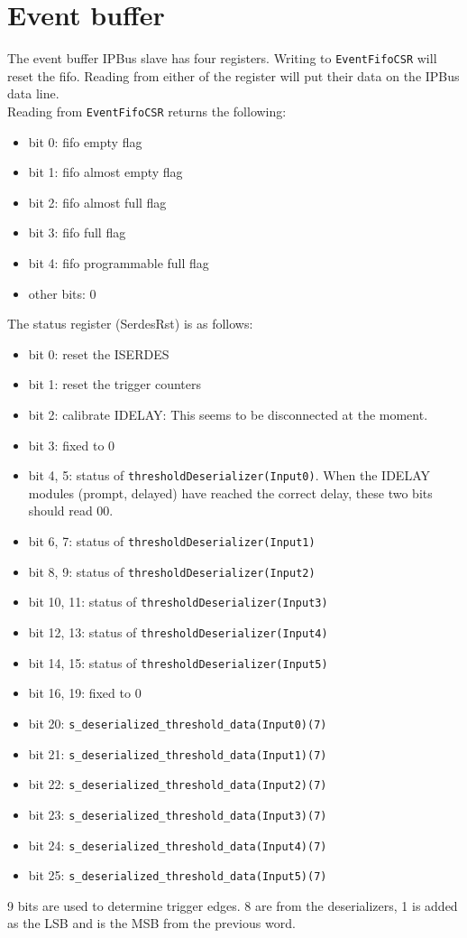 \section{Event buffer}\label{ch:eventBuffer}
The event buffer IPBus slave has four registers.
Writing to \verb|EventFifoCSR| will reset the \gls{fifo}. Reading from either of the register will put their data on the IPBus data line.\\
Reading from \verb|EventFifoCSR| returns the following:
\begin{itemize}
  \item bit 0: \gls{fifo} empty flag
  \item bit 1: \gls{fifo} almost empty flag
  \item bit 2: \gls{fifo} almost full flag
  \item bit 3: \gls{fifo} full flag
  \item bit 4: \gls{fifo} programmable full flag
  \item other bits: 0
\end{itemize}


The status register (SerdesRst) is as follows:
\begin{itemize}
  \item bit 0: reset the ISERDES
  \item bit 1: reset the trigger counters
  \item bit 2: calibrate IDELAY: This seems to be disconnected at the moment.
  \item bit 3: fixed to 0
  \item bit 4, 5: status of \verb|thresholdDeserializer(Input0)|. When the IDELAY modules (prompt, delayed) have reached the correct delay, these two bits should read 00.
  \item bit 6, 7: status of \verb|thresholdDeserializer(Input1)|
  \item bit 8, 9: status of \verb|thresholdDeserializer(Input2)|
  \item bit 10, 11: status of \verb|thresholdDeserializer(Input3)|
  \item bit 12, 13: status of \verb|thresholdDeserializer(Input4)|
  \item bit 14, 15: status of \verb|thresholdDeserializer(Input5)|
  \item bit 16, 19: fixed to 0
  \item bit 20: \verb|s_deserialized_threshold_data(Input0)(7)|
  \item bit 21: \verb|s_deserialized_threshold_data(Input1)(7)|
  \item bit 22: \verb|s_deserialized_threshold_data(Input2)(7)|
  \item bit 23: \verb|s_deserialized_threshold_data(Input3)(7)|
  \item bit 24: \verb|s_deserialized_threshold_data(Input4)(7)|
  \item bit 25: \verb|s_deserialized_threshold_data(Input5)(7)|
  \end{itemize}

9 bits are used to determine trigger edges. 8 are from the deserializers, 1 is added as the LSB and is the MSB from the previous word.